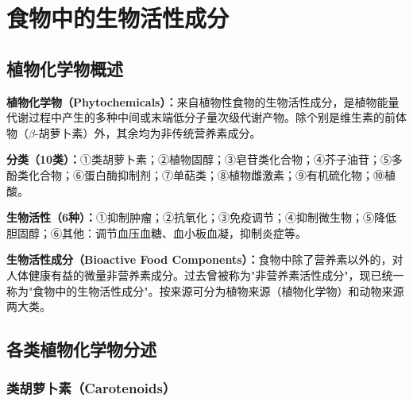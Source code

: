 \chapter{食物中的生物活性成分}
\setcounter{chapter}{2}

\section{植物化学物概述}

\begin{keybox}
\textbf{植物化学物（Phytochemicals）：}来自植物性食物的生物活性成分，是植物能量代谢过程中产生的多种中间或末端低分子量次级代谢产物。除个别是维生素的前体物（$\beta$-胡萝卜素）外，其余均为非传统营养素成分。

\textbf{分类（10类）：}①类胡萝卜素；②植物固醇；③皂苷类化合物；④芥子油苷；⑤多酚类化合物；⑥蛋白酶抑制剂；⑦单萜类；⑧植物雌激素；⑨有机硫化物；⑩植酸。

\textbf{生物活性（6种）：}①抑制肿瘤；②抗氧化；③免疫调节；④抑制微生物；⑤降低胆固醇；⑥其他：调节血压血糖、血小板血凝，抑制炎症等。
\end{keybox}

\begin{defbox}
\textbf{生物活性成分（Bioactive Food Components）：}食物中除了营养素以外的，对人体健康有益的微量非营养素成分。过去曾被称为"非营养素活性成分"，现已统一称为"食物中的生物活性成分"。按来源可分为植物来源（植物化学物）和动物来源两大类。
\end{defbox}

\section{各类植物化学物分述}

\subsection{类胡萝卜素（Carotenoids）}

